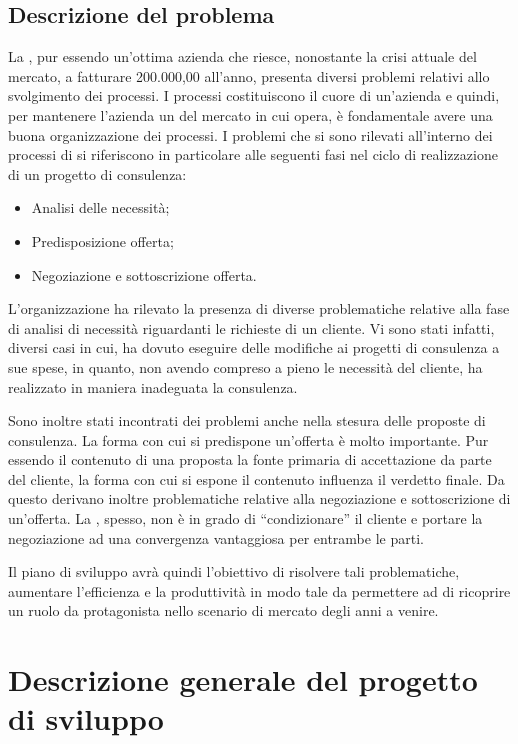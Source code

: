 \section{Descrizione del problema}
La \customer , pur essendo un'ottima azienda che riesce, nonostante la crisi attuale del mercato, a fatturare  200.000,00 \text{\euro} all'anno, presenta diversi problemi relativi allo svolgimento dei processi.
I processi costituiscono il cuore di un'azienda e quindi, per mantenere l'azienda un  del mercato in cui opera, è fondamentale avere una buona organizzazione dei processi.
I problemi che si sono rilevati all'interno dei processi di \customer si riferiscono in particolare alle seguenti fasi nel ciclo di realizzazione di un progetto di consulenza:
\begin{itemize}
	\item Analisi delle necessità;
	\item Predisposizione offerta;
	\item Negoziazione e sottoscrizione offerta.
\end{itemize}

L'organizzazione ha rilevato la presenza di diverse problematiche relative alla fase di analisi di necessità riguardanti le richieste di un cliente. Vi sono stati infatti, diversi casi in cui, \customer  ha dovuto eseguire delle modifiche ai progetti di consulenza a sue spese, in quanto, non avendo compreso a pieno le necessità del cliente, ha  realizzato in maniera inadeguata la consulenza. 

Sono inoltre stati incontrati dei problemi anche nella stesura delle proposte di consulenza. La forma con cui si predispone un'offerta è molto importante. Pur essendo il contenuto di una proposta la fonte primaria di accettazione da parte del cliente, la forma con cui si espone il contenuto influenza il verdetto finale.
Da questo derivano inoltre problematiche relative alla negoziazione e sottoscrizione di un'offerta. La \customer , spesso, non è in grado di ``condizionare'' il cliente e portare la negoziazione ad una convergenza vantaggiosa per entrambe le parti.

Il piano di sviluppo avrà quindi l'obiettivo di risolvere tali problematiche, aumentare l'efficienza e la produttività in modo tale da permettere ad \customer di ricoprire un ruolo da protagonista nello scenario di mercato degli anni a venire.


\chapter{Descrizione generale del progetto di sviluppo}


